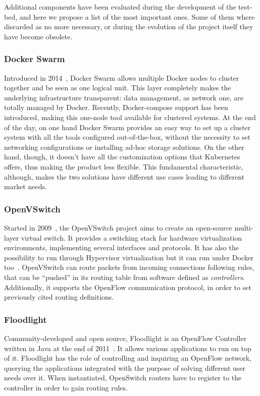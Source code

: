 Additional components have been evaluated during the development of the 
test-bed, and here we propose a list of the most important ones. Some of them 
where discarded as no more necessary, or during the evolution of the project 
itself they have become obsolete.

\subsubsection{Docker Swarm}
\label{chap:prjan:sec:tech:sub:other:sub:swarm}
Introduced in 2014~\cite{swarmGit}, Docker Swarm allows multiple Docker nodes to
cluster together and be seen as one logical unit. This layer completely makes
the underlying infrastructure transparent: data management, as network one, are
totally managed by Docker. Recently, Docker-compose support has been introduced,
making this one-node tool available for clustered systems. At the end of the
day, on one hand Docker Swarm provides an easy way to set up a cluster system
with all the tools configured out-of-the-box, without the necessity to set
networking configurations or installing ad-hoc storage solutions. On the other
hand, though, it doesn't have all the customization options that Kubernetes
offers, thus making the product less flexible. This fundamental characteristic,
although, makes the two solutions have different use cases leading to different
market needs.

\subsubsection{OpenVSwitch}
Started in 2009~\cite{ovsGit}, the OpenVSwitch project aims to create an
open-source multi-layer virtual switch. It provides a switching stack for
hardware virtualization environments, implementing several interfaces and
protocols. It has also the possibility to run through Hypervisor virtualization
but it can run under Docker too~\cite{ovsDocker}. OpenVSwitch can route packets
from incoming connections following rules, that can be ``pushed'' in its routing
table from software defined as \textit{controllers}. Additionally, it supports
the OpenFlow communication protocol, in order to set previously cited routing
definitions.

\subsubsection{Floodlight}
\label{chap:prjan:sec:tech:sub:other:sub:floodlight}
Community-developed and open source, Floodlight is an OpenFlow Controller
written in Java at the end of 2011~\cite{floodlightGit}. It allows various
applications to run on top of it. Floodlight has the role of controlling and
inquiring an OpenFlow network, querying the applications integrated with the
purpose of solving different user needs over it. When instantiated, OpenSwitch
routers have to register to the controller in order to gain routing rules.


